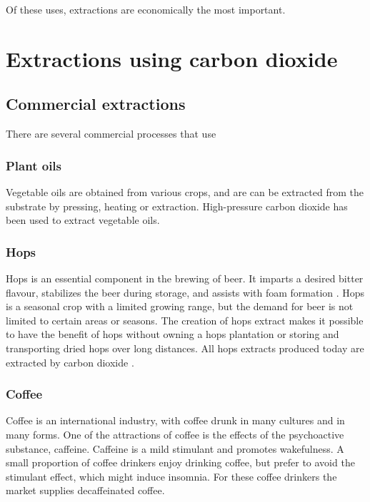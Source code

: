 
Of these uses, extractions are economically the most important.

\section{Extractions using carbon dioxide}

\subsection{Commercial extractions}

There are several commercial processes that use

\subsubsection{Plant oils}

Vegetable oils are obtained from various crops, and are can be extracted from
the substrate by pressing, heating or extraction. High-pressure carbon dioxide
has been used to extract vegetable oils. 

\subsubsection{Hops}

Hops is an essential component in the brewing of beer. It imparts a desired
bitter flavour, stabilizes the beer during storage, and assists with foam
formation \autocite{Schoenberger2011}. Hops is a seasonal crop with a limited
growing range, but the demand for beer is not limited to certain areas or
seasons. The creation of hops extract makes it possible to have the benefit of
hops without owning a hops plantation or storing and transporting dried hops
over long distances. All hops extracts produced today are extracted by carbon dioxide \autocite{Hunt2010}. 

\subsubsection{Coffee}

Coffee is an international industry, with coffee drunk in many cultures and in
many forms. One of the attractions of coffee is the effects of the psychoactive
substance, caffeine. Caffeine is a mild stimulant and promotes wakefulness. A
small proportion of coffee drinkers enjoy drinking coffee, but prefer to avoid
the stimulant effect, which might induce insomnia. For these coffee drinkers the
market supplies decaffeinated coffee. 

